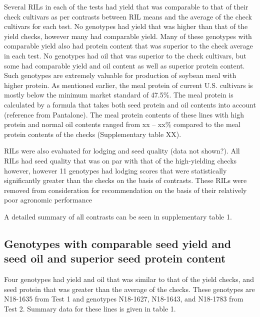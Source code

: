 \documentclass[Agronomy,article,submit,moreauthors,pdftex]{mdpi}
\begin{document}
Several RILs in each of the tests had yield that was comparable to that
of their check cultivars as per contrasts between RIL means and the
average of the check cultivars for each test. No genotypes had yield
that was higher than that of the yield checks, however many had
comparable yield. Many of these genotypes with comparable yield also had
protein content that was superior to the check average in each test. No
genotypes had oil that was superior to the check cultivars, but some had
comparable yield and oil content as well as superior protein content.
Such genotypes are extremely valuable for production of soybean meal
with higher protein. As mentioned earlier, the meal protein of current
U.S. cultivars is mostly below the minimum market standard of 47.5\%.
The meal protein is calculated by a formula that takes both seed protein
and oil contents into account (reference from Pantalone). The meal
protein contents of these lines with high protein and normal oil
contents ranged from xx -- xx\% compared to the meal protein contents of
the checks (Supplementary table XX).

RILs were also evaluated for lodging and seed quality (data not shown?).
All RILs had seed quality that was on par with that of the high-yielding
checks however, however 11 genotypes had lodging scores that were
statistically significantly greater than the checks on the basis of
contrasts. These RILs were removed from consideration for recommendation
on the basis of their relatively poor agronomic performance

A detailed summary of all contrasts can be seen in supplementary table
1.

\hypertarget{genotypes-with-comparable-seed-yield-and-seed-oil-and-superior-seed-protein-content}{%
\subsection{Genotypes with comparable seed yield and seed oil and
superior seed protein
content}\label{genotypes-with-comparable-seed-yield-and-seed-oil-and-superior-seed-protein-content}}

Four genotypes had yield and oil that was similar to that of the yield
checks, and seed protein that was greater than the average of the
checks. These genotypes are N18-1635 from Test 1 and genotypes N18-1627,
N18-1643, and N18-1783 from Test 2. Summary data for these lines is
given in table 1.
\end{document}
